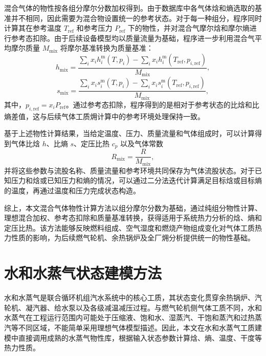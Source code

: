 混合气体的物性按各组分摩尔分数加权得到。由于数据库中各气体焓和熵选取的基准并不相同，因此需要为混合物设置统一的参考状态。对于每一种组分，程序同时计算其在参考温度 \(T_{\mathrm{ref}}\) 和参考压力 \(P_{\mathrm{ref}}\) 下的物性，并对混合气摩尔焓和摩尔熵进行参考态扣除。由于后续设备模型均以质量流量为基础，程序进一步利用混合气平均摩尔质量 \(M_{\mathrm{mix}}\) 将摩尔基准转换为质量基准：
\begin{equation}\label{eq:mix-enthalpy}
h_{\mathrm{mix}}
=
\frac{
\sum_i x_i h_i^{\mathrm{m}}(T,p_i)
-
\sum_i x_i h_i^{\mathrm{m}}(T_{\mathrm{ref}},p_{i,\mathrm{ref}})
}
{M_{\mathrm{mix}}},
\end{equation}
\begin{equation}\label{eq:mix-entropy}
s_{\mathrm{mix}}
=
\frac{
\sum_i x_i s_i^{\mathrm{m}}(T,p_i)
-
\sum_i x_i s_i^{\mathrm{m}}(T_{\mathrm{ref}},p_{i,\mathrm{ref}})
}
{M_{\mathrm{mix}}},
\end{equation}
其中，\(p_{i,\mathrm{ref}}=x_iP_{\mathrm{ref}}\)。通过参考态扣除，程序得到的是相对于参考状态的比焓和比熵差值，这与后续气体工质㶲计算中的参考环境处理保持一致。

基于上述物性计算结果，当给定温度、压力、质量流量和气体组成时，可以计算得到气体比焓 \(h\)、比熵 \(s\)、定压比热 \(c_p\) 以及气体常数
\begin{equation}\label{eq:mix-gas-constant}
R_{\mathrm{mix}}=\frac{R}{M_{\mathrm{mix}}},
\end{equation}
并将这些参数与流股名称、质量流量和参考环境共同保存为气体流股状态。对于已知压力和焓或已知压力和熵的情况，可以通过二分法迭代计算满足目标焓或目标熵的温度，再通过温度和压力完成状态构造。

综上，本文混合气体物性计算方法以组分摩尔分数为基础，通过纯组分物性计算、理想混合加权、参考态扣除和质量基准转换，获得适用于系统热力分析的焓、熵和定压比热。该方法能够反映燃料组成、空气湿度和燃烧产物组成变化对气体工质热力性质的影响，为后续燃气轮机、余热锅炉及全厂㶲分析提供统一的物性基础。

\section{水和水蒸气状态建模方法}

水和水蒸气是联合循环机组汽水系统中的核心工质，其状态变化贯穿余热锅炉、汽轮机、凝汽器、给水泵以及各级减温减压过程。与燃气轮机侧气体工质不同，水和水蒸气在工程运行范围内可能处于压缩液、饱和水、湿蒸汽、干饱和蒸汽和过热蒸汽等不同区域，不能简单采用理想气体模型描述。因此，本文在水和水蒸气工质建模中直接调用成熟的水蒸气物性库，根据输入状态参数计算焓、熵、温度、干度等热力性质。

